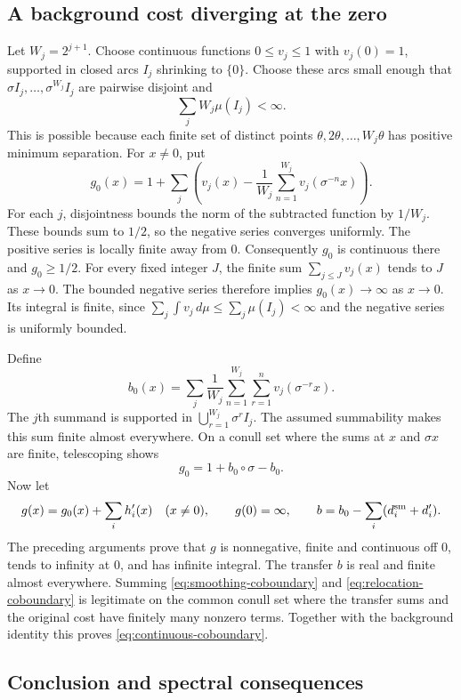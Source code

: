 \subsection{A background cost diverging at the zero}

Let $W_j=2^{j+1}$.  Choose continuous functions $0\le v_j\le1$ with
$v_j(0)=1$, supported in closed arcs $I_j$ shrinking to $\{0\}$.  Choose
these arcs small enough that $\sigma I_j,\ldots,\sigma^{W_j}I_j$ are
pairwise disjoint and
\[
 \sum_j W_j\mu(I_j)<\infty.
\]
This is possible because each finite set of distinct points
$\theta,2\theta,\ldots,W_j\theta$ has positive minimum separation.
For $x\ne0$, put
\[
 g_0(x)=1+\sum_j\left(v_j(x)-\frac1{W_j}
                              \sum_{n=1}^{W_j}v_j(\sigma^{-n}x)\right).
\]
For each $j$, disjointness bounds the norm of the subtracted function by
$1/W_j$.  These bounds sum to $1/2$, so the negative series converges
uniformly.  The positive series is locally finite away from $0$.
Consequently $g_0$ is continuous there and $g_0\ge1/2$.  For every fixed
integer $J$, the finite sum $\sum_{j\le J}v_j(x)$ tends to $J$ as $x\to0$.
The bounded negative series therefore implies $g_0(x)\to\infty$ as
$x\to0$.  Its integral is finite, since
$\sum_j\int v_j\,d\mu\le\sum_j\mu(I_j)<\infty$ and the negative series
is uniformly bounded.

Define
\[
 b_0(x)=\sum_j\frac1{W_j}\sum_{n=1}^{W_j}\sum_{r=1}^n
                                      v_j(\sigma^{-r}x).
\]
The $j$th summand is supported in $\bigcup_{r=1}^{W_j}\sigma^r I_j$.
The assumed summability makes this sum finite almost everywhere.  On a
conull set where the sums at $x$ and $\sigma x$ are finite, telescoping
shows
\[
 g_0=1+b_0\circ\sigma-b_0.
\]
Now let
\[
 g(x)=g_0(x)+\sum_i h'_i(x)\quad(x\ne0),\qquad g(0)=\infty,
 \qquad b=b_0-\sum_i(d_i^{\rm sm}+d'_i).
\]
The preceding arguments prove that $g$ is nonnegative, finite and
continuous off $0$, tends to infinity at $0$, and has infinite integral.
The transfer $b$ is real and finite almost everywhere.  Summing
\eqref{eq:smoothing-coboundary} and \eqref{eq:relocation-coboundary} is
legitimate on the common conull set where the transfer sums and the
original cost have finitely many nonzero terms.  Together with the
background identity this proves \eqref{eq:continuous-coboundary}.

\subsection{Conclusion and spectral consequences}

